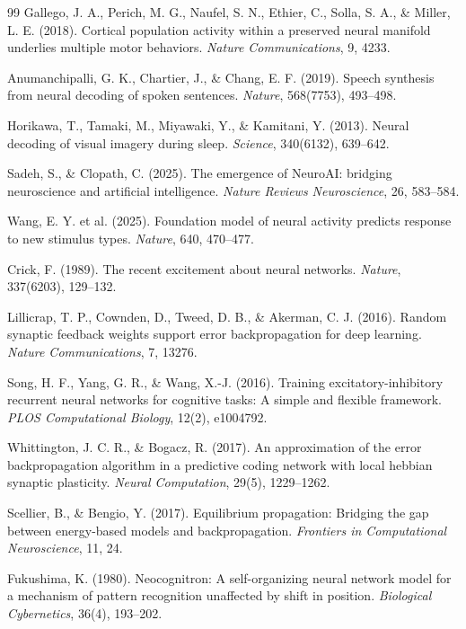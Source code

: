 \documentclass[11pt]{book}
\begin{document}
\begin{thebibliography}{99}
Gallego, J. A., Perich, M. G., Naufel, S. N., Ethier, C., Solla, S. A., \& Miller, L. E. (2018). Cortical population activity within a preserved neural manifold underlies multiple motor behaviors. \textit{Nature Communications}, 9, 4233.

Anumanchipalli, G. K., Chartier, J., \& Chang, E. F. (2019). Speech synthesis from neural decoding of spoken sentences. \textit{Nature}, 568(7753), 493--498.

Horikawa, T., Tamaki, M., Miyawaki, Y., \& Kamitani, Y. (2013). Neural decoding of visual imagery during sleep. \textit{Science}, 340(6132), 639--642.

Sadeh, S., \& Clopath, C. (2025). The emergence of NeuroAI: bridging neuroscience and artificial intelligence. \textit{Nature Reviews Neuroscience}, 26, 583--584.

Wang, E. Y. et al. (2025). Foundation model of neural activity predicts response to new stimulus types. \textit{Nature}, 640, 470--477.

Crick, F. (1989). The recent excitement about neural networks. \textit{Nature}, 337(6203), 129--132.

Lillicrap, T. P., Cownden, D., Tweed, D. B., \& Akerman, C. J. (2016). Random synaptic feedback weights support error backpropagation for deep learning. \textit{Nature Communications}, 7, 13276.

Song, H. F., Yang, G. R., \& Wang, X.-J. (2016). Training excitatory-inhibitory recurrent neural networks for cognitive tasks: A simple and flexible framework. \textit{PLOS Computational Biology}, 12(2), e1004792.

Whittington, J. C. R., \& Bogacz, R. (2017). An approximation of the error backpropagation algorithm in a predictive coding network with local hebbian synaptic plasticity. \textit{Neural Computation}, 29(5), 1229--1262.

Scellier, B., \& Bengio, Y. (2017). Equilibrium propagation: Bridging the gap between energy-based models and backpropagation. \textit{Frontiers in Computational Neuroscience}, 11, 24.

Fukushima, K. (1980). Neocognitron: A self-organizing neural network model for a mechanism of pattern recognition unaffected by shift in position. \textit{Biological Cybernetics}, 36(4), 193--202.


\end{thebibliography}
\end{document}
